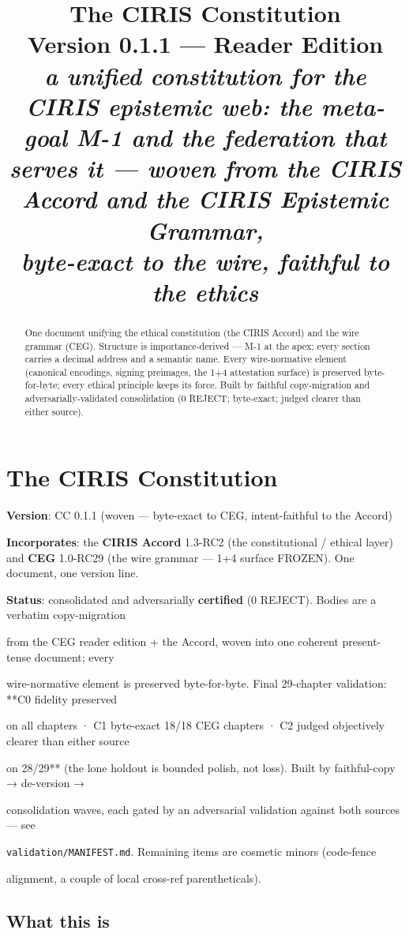 \documentclass[11pt]{article}
\title{\vspace{-1cm}\Huge\bfseries\color{accent}The CIRIS Constitution\\[10pt]
\normalsize\mdseries Version 0.1.1 --- Reader Edition\\[10pt]
\itshape a unified constitution for the CIRIS epistemic web: the meta-goal M-1 and the
federation that serves it --- woven from the CIRIS Accord and the CIRIS Epistemic Grammar,\\
byte-exact to the wire, faithful to the ethics}
\author{}\date{}
\begin{document}
\maketitle\thispagestyle{empty}
\begin{abstract}\noindent
One document unifying the ethical constitution (the CIRIS Accord) and the wire grammar (CEG).
Structure is importance-derived --- M-1 at the apex; every section carries a decimal address and a
semantic name. Every wire-normative element (canonical encodings, signing preimages, the 1+4
attestation surface) is preserved byte-for-byte; every ethical principle keeps its force. Built by
faithful copy-migration and adversarially-validated consolidation (0 REJECT; byte-exact; judged
clearer than either source).
\end{abstract}
\tableofcontents\newpage

\section*{The CIRIS Constitution}


\textbf{Version}: CC 0.1.1 (woven — byte-exact to CEG, intent-faithful to the Accord)

\textbf{Incorporates}: the \textbf{CIRIS Accord} 1.3-RC2 (the constitutional / ethical layer) and \textbf{CEG} 1.0-RC29 (the wire grammar — 1+4 surface FROZEN). One document, one version line.

\textbf{Status}: consolidated and adversarially \textbf{certified} (0 REJECT). Bodies are a verbatim copy-migration

from the CEG reader edition + the Accord, woven into one coherent present-tense document; every

wire-normative element is preserved byte-for-byte. Final 29-chapter validation: **C0 fidelity preserved

on all chapters · C1 byte-exact 18/18 CEG chapters · C2 judged objectively clearer than either source

on 28/29** (the lone holdout is bounded polish, not loss). Built by faithful-copy → de-version →

consolidation waves, each gated by an adversarial validation against both sources — see

\texttt{validation/MANIFEST.md}. Remaining items are cosmetic minors (code-fence

alignment, a couple of local cross-ref parentheticals).



\subsection*{What this is}
\end{document}
